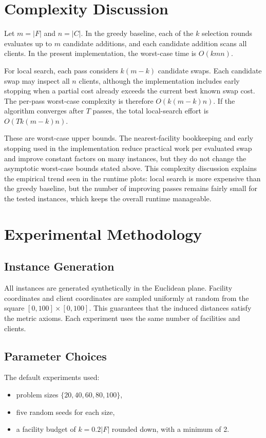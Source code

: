 \documentclass[11pt]{article}
\begin{document}
\section{Complexity Discussion}
Let $m = |F|$ and $n = |C|$. In the greedy baseline, each of the $k$ selection rounds evaluates up to $m$ candidate additions, and each candidate addition scans all clients. In the present implementation, the worst-case time is $O(kmn)$.

For local search, each pass considers $k(m-k)$ candidate swaps. Each candidate swap may inspect all $n$ clients, although the implementation includes early stopping when a partial cost already exceeds the current best known swap cost. The per-pass worst-case complexity is therefore $O(k(m-k)n)$. If the algorithm converges after $T$ passes, the total local-search effort is $O(Tk(m-k)n)$.

These are worst-case upper bounds. The nearest-facility bookkeeping and early stopping used in the implementation reduce practical work per evaluated swap and improve constant factors on many instances, but they do not change the asymptotic worst-case bounds stated above. This complexity discussion explains the empirical trend seen in the runtime plots: local search is more expensive than the greedy baseline, but the number of improving passes remains fairly small for the tested instances, which keeps the overall runtime manageable.

\section{Experimental Methodology}
\subsection{Instance Generation}
All instances are generated synthetically in the Euclidean plane. Facility coordinates and client coordinates are sampled uniformly at random from the square $[0,100] \times [0,100]$. This guarantees that the induced distances satisfy the metric axioms. Each experiment uses the same number of facilities and clients.

\subsection{Parameter Choices}
The default experiments used:
\begin{itemize}
    \item problem sizes $\{20, 40, 60, 80, 100\}$,
    \item five random seeds for each size,
    \item a facility budget of $k = 0.2|F|$ rounded down, with a minimum of 2.
\end{itemize}
\end{document}
